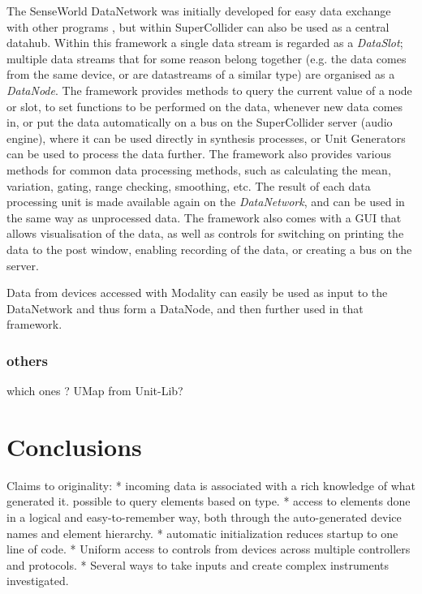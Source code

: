 \documentclass{article}
\begin{document}
The SenseWorld DataNetwork was initially developed for easy data exchange with other programs \cite{Baalman2010}, but within SuperCollider can also be used as a central datahub. Within this framework a single data stream is regarded as a \emph{DataSlot}; multiple data streams that for some reason belong together (e.g. the data comes from the same device, or are datastreams of a similar type) are organised as a \emph{DataNode}. The framework provides methods to query the current value of a node or slot, to set functions to be performed on the data, whenever new data comes in, or put the data automatically on a bus on the SuperCollider server (audio engine), where it can be used directly in synthesis processes, or Unit Generators can be used to process the data further.
The framework also provides various methods for common data processing methods, such as calculating the mean, variation, gating, range checking, smoothing, etc. The result of each data processing unit is made available again on the \emph{DataNetwork}, and can be used in the same way as unprocessed data. The framework also comes with a GUI that allows visualisation of the data, as well as controls for switching on printing the data to the post window, enabling recording of the data, or creating a bus on the server.

Data from devices accessed with Modality can easily be used as input to the DataNetwork and thus form a DataNode, and then further used in that framework.

\subsubsection{others}

which ones ? UMap from Unit-Lib?


\section{Conclusions}
\label{sec:conclusions}


Claims to originality:
* incoming data is associated with a rich knowledge of what generated it. possible to query elements based on type.
* access to elements done in a logical and easy-to-remember way, both through the auto-generated device names and element hierarchy.
* automatic initialization reduces startup to one line of code.
* Uniform access to controls from devices across multiple controllers and protocols.
* Several ways to take inputs and create complex instruments investigated.
\end{document}
